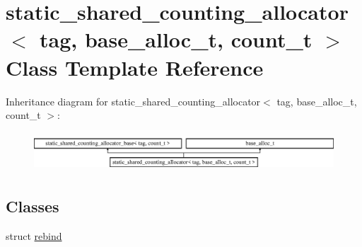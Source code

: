 \hypertarget{classstatic__shared__counting__allocator}{}\section{static\+\_\+shared\+\_\+counting\+\_\+allocator$<$ tag, base\+\_\+alloc\+\_\+t, count\+\_\+t $>$ Class Template Reference}
\label{classstatic__shared__counting__allocator}
Inheritance diagram for static\+\_\+shared\+\_\+counting\+\_\+allocator$<$ tag, base\+\_\+alloc\+\_\+t, count\+\_\+t $>$\+:\begin{figure}[H]
\begin{center}
\leavevmode
\includegraphics[height=1.485411cm]{classstatic__shared__counting__allocator}
\end{center}
\end{figure}
\subsection*{Classes}
\begin{DoxyCompactItemize}
\item 
struct \hyperlink{structstatic__shared__counting__allocator_1_1rebind}{rebind}
\end{DoxyCompactItemize}
